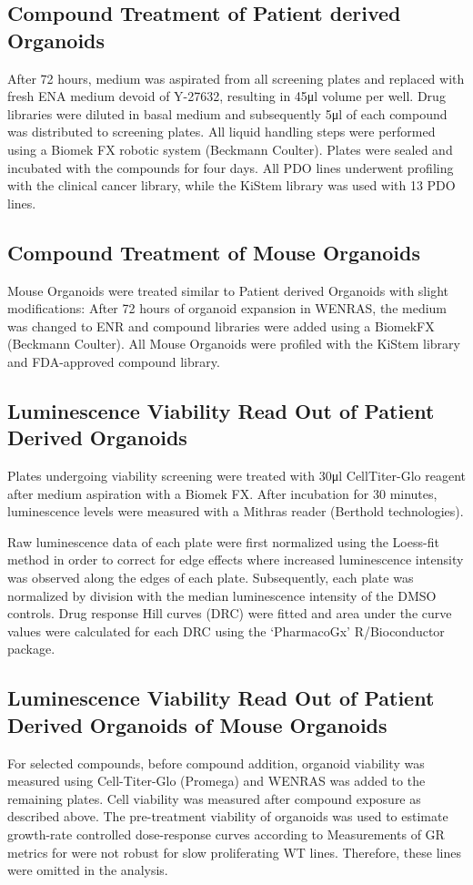 \begin{flushleft}
\subsection{Compound Treatment of Patient derived Organoids}
After 72 hours, medium was aspirated from all screening plates and replaced with fresh ENA medium devoid of Y-27632, resulting in 45μl volume per well. Drug libraries were diluted in basal medium and subsequently 5μl of each compound was distributed to screening plates. 
All liquid handling steps were performed using a Biomek FX robotic system (Beckmann Coulter). Plates were sealed and incubated with the compounds for four days. All PDO lines underwent profiling with the clinical cancer library, while the KiStem library was used with 13 PDO lines.

\subsection{Compound Treatment of Mouse Organoids}
Mouse Organoids were treated similar to Patient derived Organoids with slight modifications: After 72 hours of organoid expansion in WENRAS, the medium was changed to ENR and compound libraries were added using a BiomekFX (Beckmann Coulter). All Mouse Organoids were profiled with the KiStem library and FDA-approved compound library.

\subsection{Luminescence Viability Read Out of Patient Derived Organoids}
Plates undergoing viability screening were treated with 30μl CellTiter-Glo reagent after medium aspiration with a Biomek FX. After incubation for 30 minutes, luminescence levels were measured with a Mithras reader (Berthold technologies).

Raw luminescence data of each plate were first normalized using the Loess-fit method in order to correct for edge effects where increased luminescence intensity was observed along the edges of each plate. Subsequently, each plate was normalized by division with the median luminescence intensity of the DMSO controls. Drug response Hill curves (DRC) were fitted and area under the curve values were calculated for each DRC using the ‘PharmacoGx’ \citep{smirnovPharmacoGxPackageAnalysis2016} R/Bioconductor package.

\subsection{Luminescence Viability Read Out of Patient Derived Organoids of Mouse Organoids}
For selected compounds, before compound addition, organoid viability was measured using Cell-Titer-Glo (Promega) and WENRAS was added to the remaining plates. Cell viability was measured after compound exposure as described above. The pre-treatment viability of organoids was used to estimate growth-rate controlled dose-response curves according to \citep{hafnerGrowthRateInhibition2016} Measurements of GR metrics for were not robust for slow proliferating WT lines. Therefore, these lines were omitted in the analysis.


\end{flushleft}
